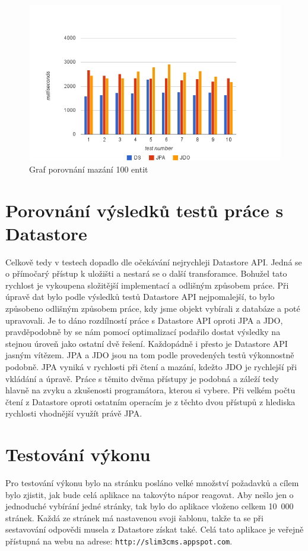 \begin{figure}[h]
\begin{center}
\includegraphics[width=6.5in]{figures/delete.png}
\caption{Graf porovnání mazání 100 entit}
\label{fig:delete}
\end{center}
\end{figure}

\section{Porovnání výsledků testů práce s Datastore}
Celkově tedy v testech dopadlo dle očekávání nejrychleji Datastore API. Jedná se o přímočarý přístup k uložišti a nestará se o další transforamce. Bohužel tato rychlost je vykoupena složitější implementací a odlišným způsobem práce. Při úpravě dat bylo podle výsledků testů Datastore API nejpomalejší, to bylo způsobeno odlišným způsobem práce, kdy jsme objekt vybírali z databáze a poté upravovali. Je to dáno rozdílností práce s Datastore API oproti JPA a JDO, pravděpodobně by se nám pomocí optimalizací podařilo dostat výsledky na stejnou úroveň jako ostatní dvě řešení. Každopádně i přesto je Datastore API jasným vítězem. JPA a JDO jsou na tom podle provedených testů výkonnostně podobně. JPA vyniká v rychlosti při čtení a mazání, kdežto JDO je rychlejší při vkládání a úpravě. Práce s těmito dvěma přístupy je podobná a záleží tedy hlavně na zvyku a zkušenosti programátora, kterou si vybere. Při velkém počtu čtení z Datastore oproti ostatním operacím je z těchto dvou přístupů z hlediska rychlosti vhodnější využít právě JPA.


\section{Testování výkonu}
Pro testování výkonu bylo na stránku posláno velké množství požadavků a cílem bylo zjistit, jak bude celá aplikace na takovýto nápor reagovat. Aby nešlo jen o jednoduché vybírání jedné stránky, tak bylo do aplikace vloženo celkem 10~000 stránek. Každá ze stránek má nastavenou svoji šablonu, takže ta se při sestavování odpovědi musela z Datastore získat také. Celá tato aplikace je veřejně přístupná na webu na adrese: \verb|http://slim3cms.appspot.com|.


